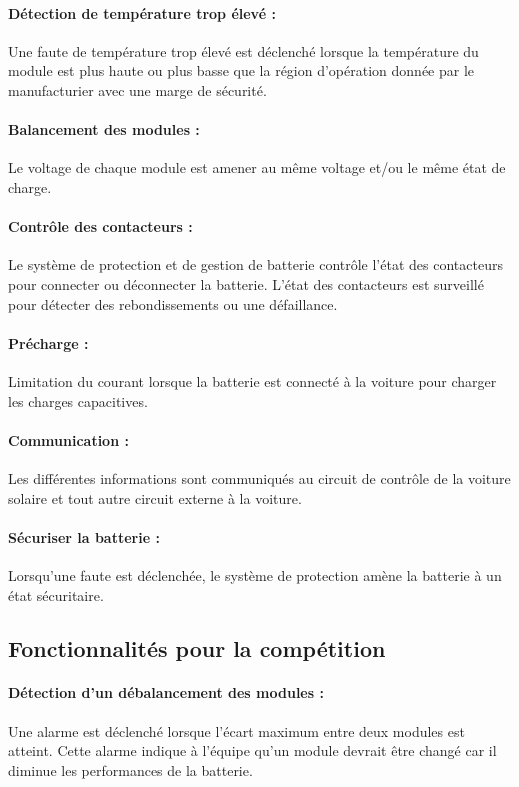 		\paragraph{Détection de température trop élevé :}
		Une faute de température trop élevé est déclenché lorsque la température du module est plus haute ou plus basse que la région d'opération donnée par le manufacturier avec une marge de sécurité.
					
		\paragraph{Balancement des modules :}
		Le voltage de chaque module est amener au même voltage et/ou le même état de charge.
		
		\paragraph{Contrôle des contacteurs :}
		Le système de protection et de gestion de batterie contrôle l'état des contacteurs pour connecter ou déconnecter la batterie. L'état des contacteurs est surveillé pour détecter des rebondissements ou une défaillance.
		
		\paragraph{Précharge :}
		Limitation du courant lorsque la batterie est connecté à la voiture pour charger les charges capacitives.
		
		\paragraph{Communication :}
		Les différentes informations sont communiqués au circuit de contrôle de la voiture solaire et tout autre circuit externe à la voiture.	
		
		\paragraph{Sécuriser la batterie :}
		Lorsqu'une faute est déclenchée, le système de protection amène la batterie à un état sécuritaire. 
			
	
	\subsection{Fonctionnalités pour la compétition}
		

			\paragraph{Détection d'un débalancement des modules :}
			Une alarme est déclenché lorsque l'écart maximum entre deux modules est atteint. Cette alarme indique à l'équipe qu'un module devrait être changé car il diminue les performances de la batterie.  
			
